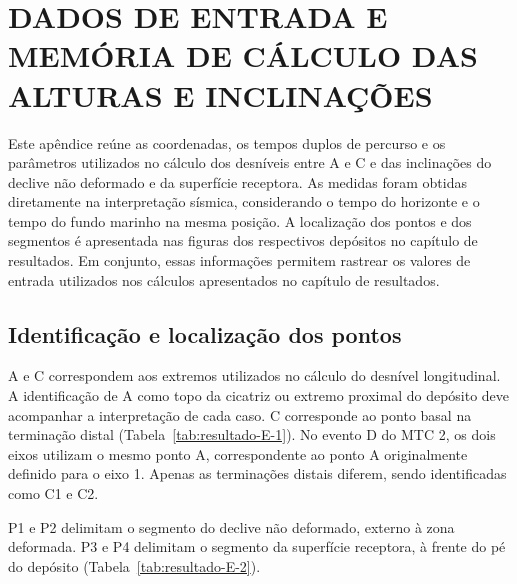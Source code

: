 \chapter{DADOS DE ENTRADA E MEMÓRIA DE CÁLCULO DAS ALTURAS E INCLINAÇÕES}\label{ap:dados-morfometria}
\setcounter{figure}{0}
\setcounter{table}{0}
\setcounter{quadro}{0}

Este apêndice reúne as coordenadas, os tempos duplos de percurso e os parâmetros utilizados no cálculo dos desníveis entre A e C e das inclinações do declive não deformado e da superfície receptora. As medidas foram obtidas diretamente na interpretação sísmica, considerando o tempo do horizonte e o tempo do fundo marinho na mesma posição. A localização dos pontos e dos segmentos é apresentada nas figuras dos respectivos depósitos no capítulo de resultados. Em conjunto, essas informações permitem rastrear os valores de entrada utilizados nos cálculos apresentados no capítulo de resultados.

\section{Identificação e localização dos pontos}

A e C correspondem aos extremos utilizados no cálculo do desnível longitudinal. A identificação de A como topo da cicatriz ou extremo proximal do depósito deve acompanhar a interpretação de cada caso. C corresponde ao ponto basal na terminação distal (Tabela~\ref{tab:resultado-E-1}). No evento D do MTC 2, os dois eixos utilizam o mesmo ponto A, correspondente ao ponto A originalmente definido para o eixo 1. Apenas as terminações distais diferem, sendo identificadas como C1 e C2.

P1 e P2 delimitam o segmento do declive não deformado, externo à zona deformada. P3 e P4 delimitam o segmento da superfície receptora, à frente do pé do depósito (Tabela~\ref{tab:resultado-E-2}).

